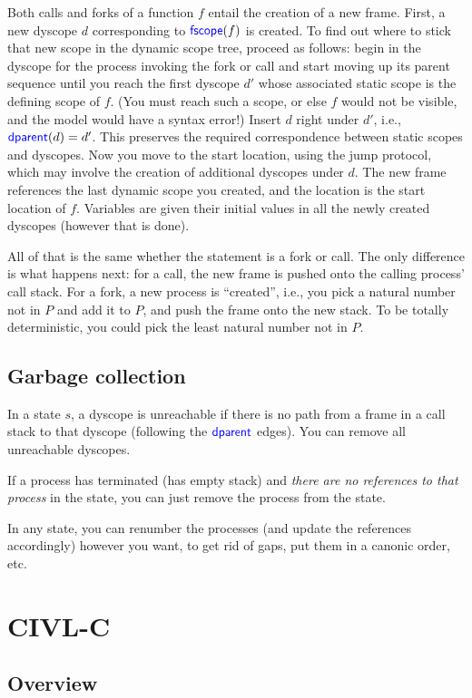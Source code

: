 \documentclass[11pt]{article}
\begin{document}
Both calls and forks of a function $f$ entail the creation of a new
frame. First, a new dyscope $d$ corresponding to $\textsf{\textcolor{blue}{\textup{fscope}}}(f)$ is
created. To find out where to stick that new scope in the dynamic
scope tree, proceed as follows: begin in the dyscope for the
process invoking the fork or call and start moving up its parent
sequence until you reach the first dyscope $d'$ whose associated
static scope is the defining scope of $f$. (You must reach such a
scope, or else $f$ would not be visible, and the model would have a
syntax error!) Insert $d$ right under $d'$, i.e.,
$\textsf{\textcolor{blue}{\textup{dparent}}}(d)=d'$. This preserves the required correspondence between
static scopes and dyscopes. Now you move to the start location,
using the jump protocol, which may involve the creation of additional
dyscopes under $d$. The new frame references the last dynamic
scope you created, and the location is the start location of $f$.
Variables are given their initial values in all the newly created
dyscopes (however that is done).

All of that is the same whether the statement is a fork or call. The
only difference is what happens next: for a call, the new frame is
pushed onto the calling process' call stack. For a fork, a new process
is ``created'', i.e., you pick a natural number not in $P$ and
add it to $P$, and push the frame onto the new stack.   To be totally
deterministic, you could pick the least natural number not in $P$.

\subsection{Garbage collection}

In a state $s$, a dyscope is unreachable if there is no path
from a frame in a call stack to that dyscope (following the
$\textsf{\textcolor{blue}{\textup{dparent}}}$ edges).  You can remove all unreachable dyscopes.

If a process has terminated (has empty stack) and \emph{there are no
references to that process} in the state, you can just remove the process
from the state.

In any state, you can renumber the processes (and update the
references accordingly) however you want, to get rid of gaps, put them
in a canonic order, etc.

\section{CIVL-C}

\subsection{Overview}
\end{document}
